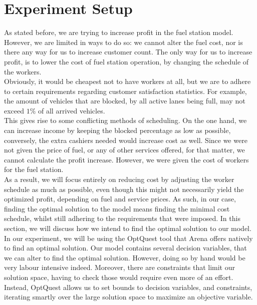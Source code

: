 \section{Experiment Setup}
As stated before, we are trying to increase profit in the fuel station model.
However, we are limited in ways to do so: we cannot alter the fuel cost, nor is there any way for us to increase customer count.
The only way for us to increase profit, is to lower the cost of fuel station operation, by changing the schedule of the workers. \\
Obviously, it would be cheapest not to have workers at all, but we are to adhere to certain requirements regarding customer satisfaction statistics.
For example, the amount of vehicles that are blocked, by all active lanes being full, may not exceed $1\%$ of all arrived vehicles. \\
This gives rise to some conflicting methods of scheduling.
On the one hand, we can increase income by keeping the blocked percentage as low as possible, conversely, the extra cashiers needed would increase cost as well.
Since we were not given the price of fuel, or any of other services offered, for that matter, we cannot calculate the profit increase.
However, we were given the cost of workers for the fuel station. \\
As a result, we will focus entirely on reducing cost by adjusting the worker schedule as much as possible, even though this might not necessarily yield the optimized profit, depending on fuel and service prices.
As such, in our case, finding the optimal solution to the model means finding the minimal cost schedule, whilst still adhering to the requirements that were imposed.
In this section, we will discuss how we intend to find the optimal solution to our model. \\

In our experiment, we will be using the OptQuest tool that Arena offers natively to find an optimal solution.
Our model contains several decision variables, that we can alter to find the optimal solution.
However, doing so by hand would be very labour intensive indeed.
Moreover, there are constraints that limit our solution space, having to check those would require even more of an effort.
Instead, OptQuest allows us to set bounds to decision variables, and constraints, iterating smartly over the large solution space to maximize an objective variable. \\

